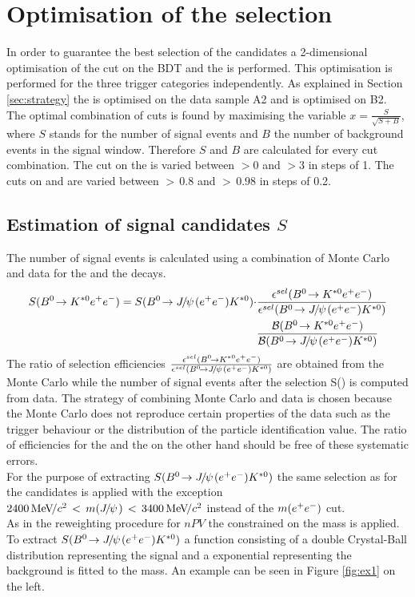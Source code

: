 \section{Optimisation of the selection}
\label{sec:opti}
In order to guarantee the best selection of the \BdKstee candidates a 2-dimensional optimisation of the cut on the BDT and the \dllepi is performed. This optimisation is performed for the three trigger categories independently. As explained in Section \ref{sec:strategy} the \bdta is optimised on the data sample A2 and \bdtb is optimised on B2.\\
The optimal combination of cuts is found by maximising the variable $x = \frac{S}{\sqrt{S+B}}$, where $S$ stands for the number of signal events and $B$ the number of background events in the signal window. Therefore $S$ and $B$ are calculated for every cut combination. The cut on the \dllepi is varied between $>0$ and $>3$ in steps of 1. The cuts on \bdta and \bdtb are varied between $> \, 0.8$ and $> \, 0.98$ in steps of 0.2.\\

\subsection{Estimation of signal candidates $S$}
The number of signal events is calculated using a combination of Monte Carlo and \lhcb data for the \BdKstee and the \BdToJPsieeKst decays.
\begin{eqnarray}
S(\BdKstee) = S(\BdToJPsieeKst) \cdot  & \frac{\epsilon^{sel}(\BdKstee)}{\epsilon^{sel}(\BdToJPsieeKst)} \nonumber \\
 &\frac{\BR(\BdKstee)}{\BR(\BdToJPsieeKst)}
\end{eqnarray}
The ratio of selection efficiencies $\frac{\epsilon^{sel}(\BdKstee)}{\epsilon^{sel}(\BdToJPsieeKst)}$ are obtained from the Monte Carlo while the number of \BdToJPsieeKst signal events after the selection S(\BdToJPsieeKst) is computed from \lhcb data. The strategy of combining Monte Carlo and \lhcb data is chosen because the Monte Carlo does not reproduce certain properties of the data such as the trigger behaviour or the distribution of the particle identification value. The ratio of efficiencies for the \BdKstee and the \BdToJPsieeKst on the other hand should be free of these systematic errors.\\
For the purpose of extracting $S(\BdToJPsieeKst)$ the same selection as for the \BdKstee candidates is applied with the exception $2400 {\mathrm{\,Me\kern -0.1em V\!/}c^2} \, < \, m({J\mskip -3mu/\mskip -2mu\psi\mskip 2mu}) \, < \, 3400 {\mathrm{\,Me\kern -0.1em V\!/}c^2} $ instead of the $m(e^+e^-) $ cut. \\
As in the reweighting procedure for $nPV $ the constrained on the \jpsi mass is applied. To extract $S(\BdToJPsieeKst)$ a function consisting of a double Crystal-Ball distribution \cite{crystal} representing the signal and a exponential representing the background is fitted to the \Bd mass.
An example can be seen in Figure \ref{fig:ex1} on the left.\\

